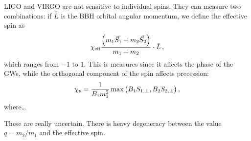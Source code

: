 \documentclass[main.tex]{subfiles}
\begin{document}
LIGO and VIRGO are not sensitive to individual spins. They can measure two combinations: if \(\hat{L}\) is the BBH orbital angular momentum, we define the effective spin as 
%
\begin{align}
\chi _{\text{eff}} \frac{\qty(m_1 \vec{S}_{1} + m_2 \vec{S}_{2})}{m_1 + m_2 } \cdot \hat{L}
\,,
\end{align}
%
which ranges from \(-1\) to \(1\). 
This is measures since it affects the phase of the GWs, while the orthogonal component of the spin affects precession: 
%
\begin{align}
\chi_{p} = \frac{1}{B_1 m_1^2} \max \qty(B_1 S_{1, \perp}, B_2 S_{2, \perp})
\,,
\end{align}
%
where\dots

These are really uncertain. 
There is heavy degeneracy between the value \(q = m_2 / m_1 \) and the effective spin. 

\end{document}
